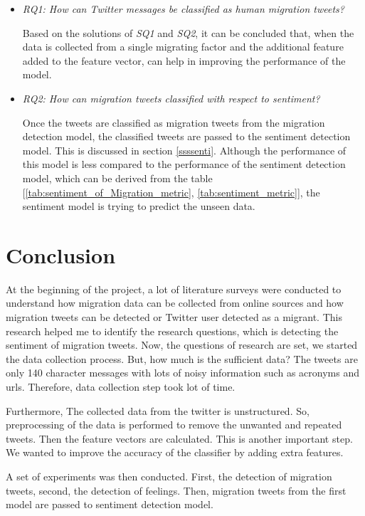 \begin{itemize}
    \item  \textit{RQ1: How can Twitter messages be classified as human migration tweets?}
    
    Based on the solutions of \textit{SQ1} and \textit{SQ2}, it can be concluded that, when the data is collected from a single migrating factor and the additional feature added to the feature vector, can help in improving the performance of the model.   
    
     \item \textit{RQ2: How can migration tweets classified with respect to sentiment?}
     
Once the tweets are classified as migration tweets from the migration detection model, the classified tweets are passed to the sentiment detection model. This is discussed in section \ref{ssssenti}. Although the performance of this model is less compared to the performance of the sentiment detection model, which can be derived from the table [\ref{tab:sentiment_of_Migration_metric}, \ref{tab:sentiment_metric}], the sentiment model is trying to predict the unseen data.  

\end{itemize}

\section{Conclusion}

At the beginning of the project, a lot of literature surveys were conducted to understand how migration data can be collected from online sources and how migration tweets can be detected or Twitter user detected as a migrant. This research helped me to identify the research questions, which is detecting the sentiment of migration tweets. Now, the questions of research are set, we started the data collection process. But, how much is the sufficient data? The tweets are only 140 character messages with lots of noisy information such as acronyms and urls. Therefore, data collection step took lot of time. 

Furthermore, The collected data from the twitter is unstructured. So, preprocessing of the data is performed to remove the unwanted and repeated tweets. Then the feature vectors are calculated. This is another important step. We wanted to improve the accuracy of the classifier by adding extra features.

A set of experiments was then conducted. First, the detection of migration tweets, second, the detection of feelings.  Then, migration tweets from the first model are passed to sentiment detection model.

